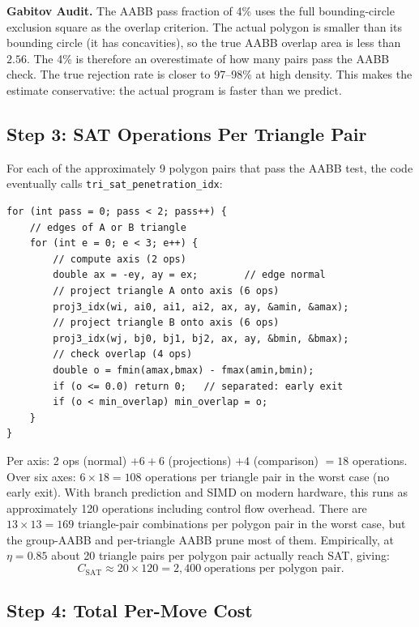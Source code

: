 \documentclass[11pt,oneside]{article}
\newcommand{\gabitov}[1]{\begin{gabitovbox}\textbf{Gabitov Audit.} #1\end{gabitovbox}}
\begin{document}
\gabitov{%
The AABB pass fraction of 4\% uses the full bounding-circle exclusion
square as the overlap criterion. The actual polygon is smaller than its
bounding circle (it has concavities), so the true AABB overlap area is
less than $2.56$. The 4\% is therefore an overestimate of how many
pairs pass the AABB check. The true rejection rate is closer to 97--98\%
at high density. This makes the estimate conservative: the actual
program is faster than we predict.%
}

\subsection{Step 3: SAT Operations Per Triangle Pair}

For each of the approximately 9 polygon pairs that pass the AABB test,
the code eventually calls \texttt{tri\_sat\_penetration\_idx}:

\begin{lstlisting}[style=cstyle,caption={SAT inner loop (one pass).}]
for (int pass = 0; pass < 2; pass++) {
    // edges of A or B triangle
    for (int e = 0; e < 3; e++) {
        // compute axis (2 ops)
        double ax = -ey, ay = ex;        // edge normal
        // project triangle A onto axis (6 ops)
        proj3_idx(wi, ai0, ai1, ai2, ax, ay, &amin, &amax);
        // project triangle B onto axis (6 ops)
        proj3_idx(wj, bj0, bj1, bj2, ax, ay, &bmin, &bmax);
        // check overlap (4 ops)
        double o = fmin(amax,bmax) - fmax(amin,bmin);
        if (o <= 0.0) return 0;   // separated: early exit
        if (o < min_overlap) min_overlap = o;
    }
}
\end{lstlisting}

Per axis: 2 ops (normal) $+ 6 + 6$ (projections) $+ 4$ (comparison)
$= 18$ operations. Over six axes: $6 \times 18 = 108$ operations per
triangle pair in the worst case (no early exit). With branch
prediction and SIMD on modern hardware, this runs as approximately 120
operations including control flow overhead. There are $13 \times 13 =
169$ triangle-pair combinations per polygon pair in the worst case, but
the group-AABB and per-triangle AABB prune most of them. Empirically,
at $\eta = 0.85$ about 20 triangle pairs per polygon pair actually
reach SAT, giving:
\begin{equation}
  C_{\mathrm{SAT}} \approx 20 \times 120 = 2{,}400 \;\text{operations per polygon pair.}
  \label{eq:csat}
\end{equation}

\subsection{Step 4: Total Per-Move Cost}
\end{document}
